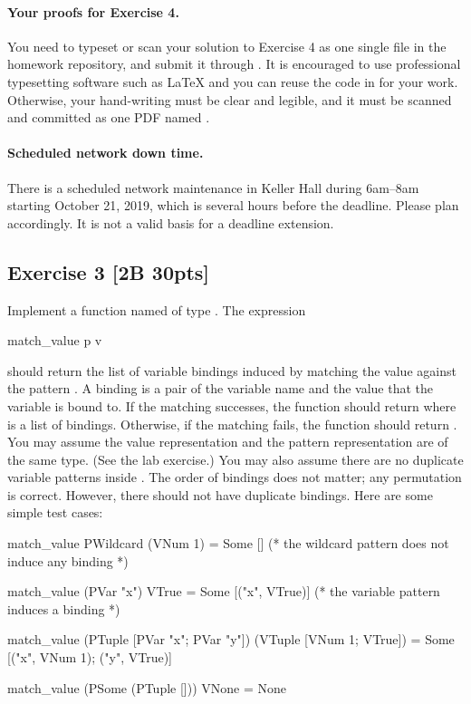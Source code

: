 \documentclass[fleqn]{article}
\begin{document}
\paragraph{Your proofs for Exercise 4.} You need to typeset or scan your solution to Exercise 4 as one single file  in the homework repository, and submit it through . It is encouraged to use professional typesetting software such as \LaTeX{} and you can reuse the code in  for your work. Otherwise, your hand-writing must be clear and legible, and it must be scanned and committed as one PDF named .

\paragraph{Scheduled network down time.}
There is a scheduled network maintenance in Keller Hall during 6am--8am starting October 21, 2019, which is several hours before the deadline. Please plan accordingly. It is not a valid basis for a deadline extension.

\subsection*{Exercise 3 [2B 30pts]}

Implement a function named  of type .
The expression
\begin{ocamlcode}
match_value p v
\end{ocamlcode}
should return the list of variable bindings induced by matching the value  against the pattern . A binding is a pair of the variable name and the value that the variable is bound to. If the matching successes, the function should return  where  is a list of bindings. Otherwise, if the matching fails, the function should return . You may assume the value representation  and the pattern representation  are of the same type. (See the lab exercise.) You may also assume there are no duplicate variable patterns inside . The order of bindings does not matter; any permutation is correct. However, there should not have duplicate bindings. Here are some simple test cases:

\begin{ocamlcode}
match_value PWildcard (VNum 1) = Some []
(* the wildcard pattern does not induce any binding *)

match_value (PVar "x") VTrue = Some [("x", VTrue)]
(* the variable pattern induces a binding *)

match_value (PTuple [PVar "x"; PVar "y"]) (VTuple [VNum 1; VTrue])
  = Some [("x", VNum 1); ("y", VTrue)]

match_value (PSome (PTuple [])) VNone = None
\end{ocamlcode}
\end{document}
